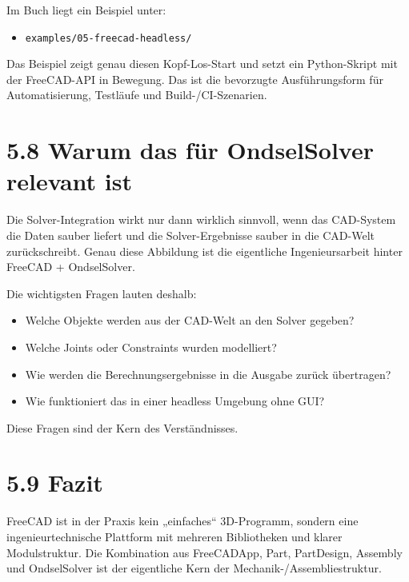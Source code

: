 \documentclass[
  12pt
]{book}
\providecommand{\tightlist}{%
  \setlength{\itemsep}{0pt}\setlength{\parskip}{0pt}}
\begin{document}
Im Buch liegt ein Beispiel unter:

\begin{itemize}
\tightlist
\item
  \texttt{examples/05-freecad-headless/}
\end{itemize}

Das Beispiel zeigt genau diesen Kopf-Los-Start und setzt ein
Python-Skript mit der FreeCAD-API in Bewegung. Das ist die bevorzugte
Ausführungsform für Automatisierung, Testläufe und Build-/CI-Szenarien.

\hypertarget{warum-das-fuxfcr-ondselsolver-relevant-ist}{%
\section{\texorpdfstring{{5.8} Warum das für OndselSolver relevant
ist}{5.8 Warum das für OndselSolver relevant ist}}\label{warum-das-fuxfcr-ondselsolver-relevant-ist}}

Die Solver-Integration wirkt nur dann wirklich sinnvoll, wenn das
CAD-System die Daten sauber liefert und die Solver-Ergebnisse sauber in
die CAD-Welt zurückschreibt. Genau diese Abbildung ist die eigentliche
Ingenieursarbeit hinter FreeCAD + OndselSolver.

Die wichtigsten Fragen lauten deshalb:

\begin{itemize}
\tightlist
\item
  Welche Objekte werden aus der CAD-Welt an den Solver gegeben?
\item
  Welche Joints oder Constraints wurden modelliert?
\item
  Wie werden die Berechnungsergebnisse in die Ausgabe zurück übertragen?
\item
  Wie funktioniert das in einer headless Umgebung ohne GUI?
\end{itemize}

Diese Fragen sind der Kern des Verständnisses.

\hypertarget{fazit-3}{%
\section{\texorpdfstring{{5.9} Fazit}{5.9 Fazit}}\label{fazit-3}}

FreeCAD ist in der Praxis kein „einfaches`` 3D-Programm, sondern eine
ingenieurtechnische Plattform mit mehreren Bibliotheken und klarer
Modulstruktur. Die Kombination aus FreeCADApp, Part, PartDesign,
Assembly und OndselSolver ist der eigentliche Kern der
Mechanik-/Assembliestruktur.
\end{document}
